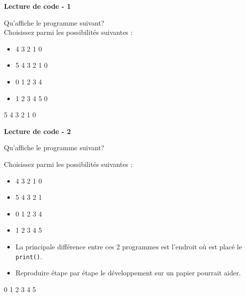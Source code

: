 	\begin{Exercice}[5 minutes] \textbf{Lecture de code - 1} 
	
	Qu'affiche le programme suivant? \\ 
	
	 
	
	Choisissez parmi les possibilités suivantes : \\
	
	\begin{itemize}
	\item 4  
	3 
	2 
	1 
	0 
	\item 5 
	4 
	3 
	2 
    1 
    0
	\item 0 
	1 
	2 
	3 
	4 
	\item 1 
	2 
	3 
	4
    5
    0
    \end{itemize}
    \begin{solution} 
			5  
			4  
			3  
			2  
			1  
			0  
		\end{solution} 
    
\end{Exercice}

\begin{Exercice}[5 minutes] \textbf{Lecture de code - 2}
    
	Qu'affiche le programme suivant?
	
	
	Choisissez parmi les possibilités suivantes : \\
	
	\begin{itemize}
	\item 4  
	3 
	2 
	1 
	0 
	\item 5 
	4 
	3 
	2 
	1 
	\item 0 
	1 
	2 
	3 
	4 
	\item 1 
	2 
	3 
	4 
	5
	\end{itemize}
	
	 
	
		\begin{conseil} 
		\begin{itemize} 
			\item La principale différence entre ces 2 programmes est l'endroit où est placé le \lstinline{print()}. 
			\item Reproduire étape par étape le développement sur un papier pourrait aider. 
		\end{itemize} 
		\end{conseil} 
	
		\begin{solution} 
			0  
			1  
			2  
			3  
			4  
			5 
	
		\end{solution} 
	
	\end{Exercice}
	
